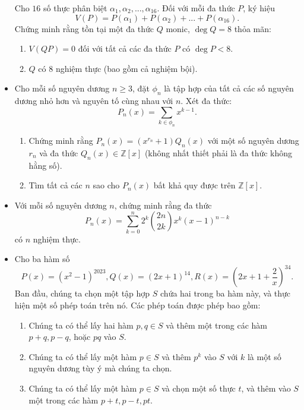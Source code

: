 \documentclass[11pt]{scrartcl}
\begin{document}
\begin{itemize}[label=, leftmargin=0em, itemsep=0.5em]
\begin{btvn}
        Cho $16$ số thực phân biệt $\alpha_1,\alpha_2,...,\alpha_{16}$. Đối với mỗi đa thức $P$, ký hiệu
        \[ V(P)=P(\alpha_1)+P(\alpha_2)+...+P(\alpha_{16}). \]
        Chứng minh rằng tồn tại một đa thức $Q$ monic, $\deg Q=8$ thỏa mãn:
            \begin{enumerate}
                \item $V(QP)=0$ đối với tất cả các đa thức $P$ có $\deg P<8$.
                \item $Q$ có $8$ nghiệm thực (bao gồm cả nghiệm bội).
            \end{enumerate}
        \end{btvn}
        \item \begin{btvn}
            Cho mỗi số nguyên dương $n\ge 3$, đặt $\phi_n$ là tập hợp của tất cả các số nguyên dương nhỏ hơn và nguyên tố cùng nhau với $n$. Xét đa thức:
            $$P_n(x)=\sum_{k\in\phi_n} {x^{k-1}}.$$
            \begin{enumerate}[label=(\alph*)]
                \item  Chứng minh rằng $P_n(x)=(x^{r_n}+1)Q_n(x)$ với một số nguyên dương $r_n$ và đa thức $Q_n(x)\in\mathbb{Z}[x]$ (không nhất thiết phải là đa thức không hằng số).
                \item Tìm tất cả các $n$ sao cho $P_n(x)$ bất khả quy được trên $\mathbb{Z}[x]$.
            \end{enumerate}
        \end{btvn}
        \item \begin{btvn}
            Với mỗi số nguyên dương $n$, chứng minh rằng đa thức$$P_n(x)=\sum _{k=0}^n2^k\binom{2n}{2k}x^k(x-1)^{n-k}$$ có $n$ nghiệm thực.
        \end{btvn}
        \item \begin{btvn} Cho ba hàm số
            $$P(x) = (x^2-1)^{2023}, Q(x) = (2x+1)^{14}, R(x) = \left(2x+1+\frac 2x \right)^{34}.$$
            Ban đầu, chúng ta chọn một tập hợp $S$ chứa hai trong ba hàm này, và thực hiện một số phép toán trên nó. Các phép toán được phép bao gồm:
            \begin{enumerate}
                \item Chúng ta có thể lấy hai hàm $p, q \in S$ và thêm một trong các hàm $p+q, p-q$, hoặc $pq$ vào $S$.
                \item Chúng ta có thể lấy một hàm $p \in S$ và thêm $p^k$ vào $S$ với $k$ là một số nguyên dương tùy ý mà chúng ta chọn.
                \item Chúng ta có thể lấy một hàm $p \in S$ và chọn một số thực $t$, và thêm vào $S$ một trong các hàm $p+t, p-t, pt$.
            \end{enumerate}
            

\end{btvn}
\end{itemize}
\end{document}
